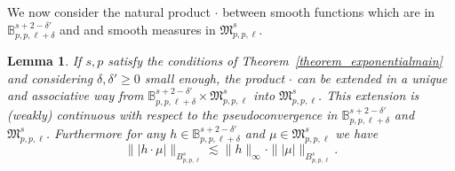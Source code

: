 \documentclass[a4paper,10pt]{article}
\newtheorem{lemma}{Lemma}
\begin{document}
We now consider the natural product $\cdot$ between smooth functions which
are in $\mathbb{B}^{s + 2 - \delta'}_{p, p, \ell + \delta}$ and and smooth
measures in $\mathfrak{M}^s_{p, p, \ell}$.

\begin{lemma}
  \label{lemma_multiplication}If $s, p$ satisfy the conditions of
  Theorem~\ref{theorem_exponentialmain} and considering $\delta, \delta'
  \geqslant 0$ small enough, the product $\cdot$ can be extended in a unique
  and associative way from $\mathbb{B}^{s + 2 - \delta'}_{p, p, \ell + \delta}
  \times \mathfrak{M}^s_{p, p, \ell}$ into $\mathfrak{M}^s_{p, p, \ell}$. This
  extension is (weakly) continuous with respect to the pseudoconvergence in
  $\mathbb{B}^{s + 2 - \delta'}_{p, p, \ell + \delta}$ and $\mathfrak{M}^s_{p,
  p, \ell}$. Furthermore for any $h \in \mathbb{B}^{s + 2 - \delta'}_{p, p,
  \ell + \delta}$ and $\mu \in \mathfrak{M}^s_{p, p, \ell}$ we have
  \begin{equation}
    \| | h \cdot \mu | \|_{B^s_{p, p, \ell}} \lesssim \| h \|_{\infty} \cdot
    \| | \mu | \|_{B^s_{p, p, \ell}} . \label{eq:exponentialmain1}
  \end{equation}
\end{lemma}
\end{document}
